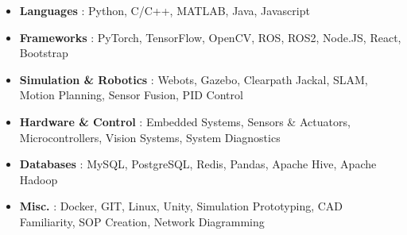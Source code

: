 \begin{cventries}  
\skillentry
{
    \begin{itemize}
        \item \textbf{Languages} : Python, C/C++, MATLAB, Java, Javascript
        \item \textbf{Frameworks} : PyTorch, TensorFlow, OpenCV, ROS, ROS2, Node.JS, React, Bootstrap
        \item \textbf{Simulation \& Robotics} : Webots, Gazebo, Clearpath Jackal, SLAM, Motion Planning, Sensor Fusion, PID Control
        \item \textbf{Hardware \& Control} : Embedded Systems, Sensors \& Actuators, Microcontrollers, Vision Systems, System Diagnostics
        \item \textbf{Databases} : MySQL, PostgreSQL, Redis, Pandas, Apache Hive, Apache Hadoop
        \item \textbf{Misc.} : Docker, GIT, Linux, Unity, Simulation Prototyping, CAD Familiarity, SOP Creation, Network Diagramming
    \end{itemize}
}



\end{cventries}
